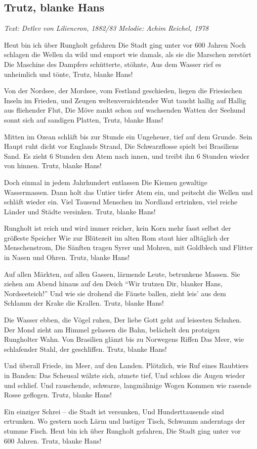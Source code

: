\documentclass[a5paper,pagesize,twoside,10pt,headings=small]{scrreprt}
\newcommand\songheader[3][]{%
  \clearpage%
    \subsection*{\centering #2}\vspace{0.5\baselineskip}%
    \addcontentsline{toc}{subsection}{#2}
    \centering \textit{#3}\\%
    \vspace{\baselineskip}\par%
}
\begin{document}
\songheader{Trutz, blanke Hans}{Text: Detlev von Liliencron, 1882/83 \quad Melodie: Achim Reichel, 1978}
\begin{guitar}%
Heut bin ich über Rungholt gefahren
Die Stadt ging unter vor 600 Jahren
Noch schlagen die Wellen da wild und emport
wie damals, als sie die Marschen zerstört
Die Maschine des Dampfers schütterte, stöhnte, 
Aus dem Wasser rief es unheimlich und tönte,
Trutz, blanke Hans!

Von der Nordsee, der Mordsee, vom Festland geschieden,
liegen die Friesischen Inseln im Frieden,
und Zeugen weltenvernichtender Wut
taucht hallig auf Hallig aus fliehender Flut,
Die Möve zankt schon auf wachsenden Watten
der Seehund sonnt sich auf sandigen Platten,
Trutz, blanke Hans!

Mitten im Ozean schläft bis zur Stunde
ein Ungeheuer, tief auf dem Grunde.
Sein Haupt ruht dicht vor Englands Strand,
Die Schwarzflosse spielt bei Brasiliens Sand.
Es zieht 6 Stunden den Atem nach innen,
und treibt ihn 6 Stunden wieder von hinnen.
Trutz, blanke Hans!

Doch einmal in jedem Jahrhundert entlassen
Die Kiemen gewaltige Wassermassen.
Dann holt das Untier tiefer Atem ein,
und peitscht die Wellen und schläft wieder ein.
Viel Tausend Menschen im Nordland ertrinken,
viel reiche Länder und Städte versinken.
Trutz, blanke Hans!

Rungholt ist reich und wird immer reicher,
kein Korn mehr fasst selbst der größeste Speicher
Wie zur Blütezeit im alten Rom
staut hier alltäglich der Menschenstrom,
Die Sänften tragen Syrer und Mohren,
mit Goldblech und Flitter in Nasen und Ohren.
Trutz, blanke Hans!

Auf allen Märkten, auf allen Gassen,
lärmende Leute, betrunkene Massen.
Sie ziehen am Abend hinaus auf den Deich
"`Wir trutzen Dir, blanker Hans, Nordseeteich!"'
Und wie sie drohend die Fäuste ballen,
zieht leis' aus dem Schlamm der Krake die Krallen.
Trutz, blanke Hans!

Die Wasser ebben, die Vögel ruhen,
Der liebe Gott geht auf leisesten Schuhen.
Der Mond zieht am Himmel gelassen die Bahn,
belächelt den protzigen Rungholter Wahn.
Von Brasilien glänzt bis zu Norwegens Riffen
Das Meer, wie schlafender Stahl, der geschliffen.
Trutz, blanke Hans!

Und überall Friede, im Meer, auf den Landen.
Plötzlich, wie Ruf eines Raubtiers in Banden:
Das Scheusal wälzte sich, atmete tief,
Und schloss die Augen wieder und schlief.
Und rauschende, schwarze, langmähnige Wogen
Kommen wie rasende Rosse geflogen.
Trutz, blanke Hans!

Ein einziger Schrei -- die Stadt ist versunken,
Und Hunderttausende sind ertrunken.
Wo gestern noch Lärm und lustiger Tisch,
Schwamm anderntags der stumme Fisch.
Heut bin ich über Rungholt gefahren,
Die Stadt ging unter vor 600 Jahren.
Trutz, blanke Hans!
\end{guitar}
\end{document}
